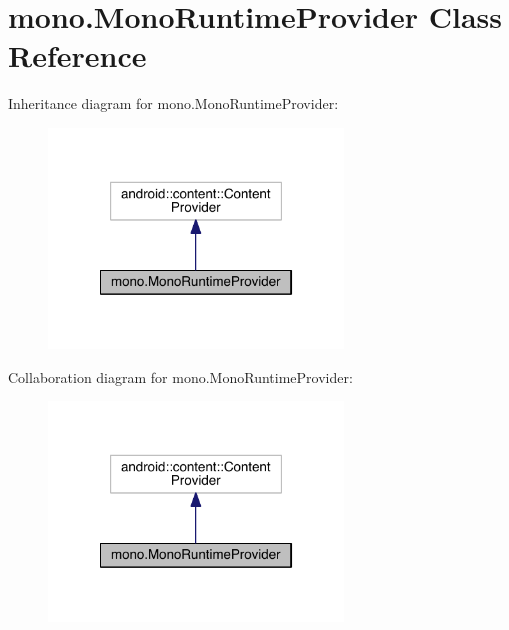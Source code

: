 \hypertarget{classmono_1_1_mono_runtime_provider}{\section{mono.\+Mono\+Runtime\+Provider Class Reference}
\label{classmono_1_1_mono_runtime_provider}
}


Inheritance diagram for mono.\+Mono\+Runtime\+Provider\+:
\nopagebreak
\begin{figure}[H]
\begin{center}
\leavevmode
\includegraphics[width=222pt]{classmono_1_1_mono_runtime_provider__inherit__graph}
\end{center}
\end{figure}


Collaboration diagram for mono.\+Mono\+Runtime\+Provider\+:
\nopagebreak
\begin{figure}[H]
\begin{center}
\leavevmode
\includegraphics[width=222pt]{classmono_1_1_mono_runtime_provider__coll__graph}
\end{center}
\end{figure}
